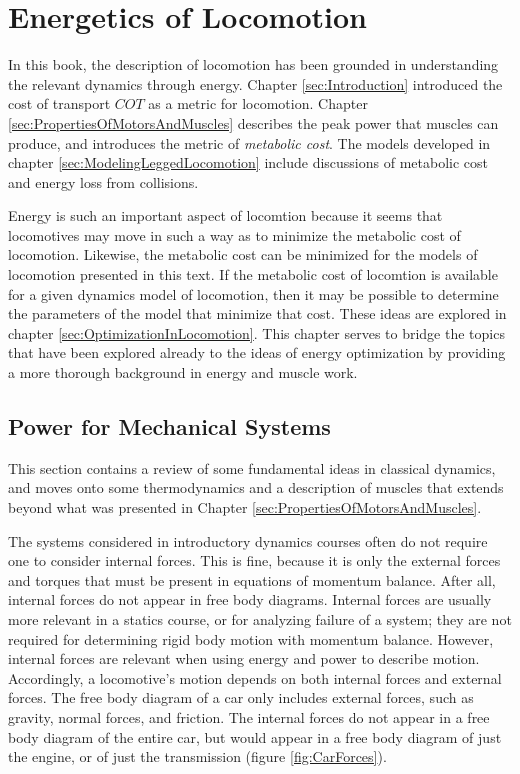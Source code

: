 \chapter{Energetics of Locomotion}
\label{sec:EnergeticsOfLocomotion}

In this book, the description of locomotion has been grounded in understanding the relevant dynamics through energy. Chapter \ref{sec:Introduction} introduced the cost of transport $COT$ as a metric for locomotion. Chapter \ref{sec:PropertiesOfMotorsAndMuscles} describes the peak power that muscles can produce, and introduces the metric of \textit{metabolic cost}. The models developed in chapter \ref{sec:ModelingLeggedLocomotion} include discussions of metabolic cost and energy loss from collisions.

Energy is such an important aspect of locomtion because it seems that locomotives may move in such a way as to minimize the metabolic cost of locomotion. Likewise, the metabolic cost can be minimized for the models of locomotion presented in this text. If the metabolic cost of locomtion is available for a given dynamics model of locomotion, then it may be possible to determine the parameters of the model that minimize that cost. These ideas are explored in chapter \ref{sec:OptimizationInLocomotion}. This chapter serves to bridge the topics that have been explored already to the ideas of energy optimization by providing a more thorough background in energy and muscle work.

\section{Power for Mechanical Systems} %
\label{sec:PowerforMechancialSystems}

This section contains a review of some fundamental ideas in classical dynamics, and moves onto some thermodynamics and a description of muscles that extends beyond what was presented in Chapter \ref{sec:PropertiesOfMotorsAndMuscles}.

The systems considered in introductory dynamics courses often do not require one to consider internal forces. This is fine, because it is only the external forces and torques that must be present in equations of momentum balance. After all, internal forces do not appear in free body diagrams.  Internal forces are usually more relevant in a statics course, or for analyzing failure of a system; they are not required for determining rigid body motion with momentum balance.  However, internal forces are relevant when using energy and power to describe motion.  Accordingly, a locomotive's motion depends on both internal forces and external forces. The free body diagram of a car only includes external forces, such as gravity, normal forces, and friction. The internal forces do not appear in a free body diagram of the entire car, but would appear in a free body diagram of just the engine, or of just the transmission (figure \ref{fig:CarForces}).

